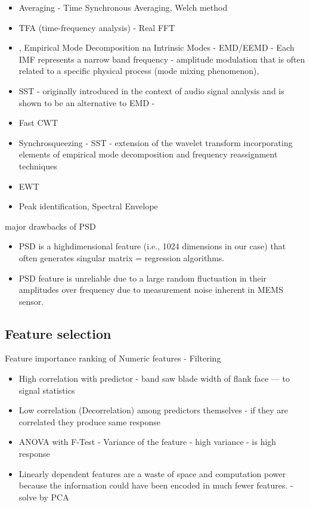 \begin{itemize}
\item Averaging - Time Synchronous Averaging, Welch method
\item TFA (time-frequency analysis) - Real FFT
\item, Empirical Mode Decomposition na Intrinsic Modes - EMD/EEMD - Each IMF represents a narrow band frequency - amplitude modulation that is often related to a specific physical process (mode mixing phenomenon),\cite{wang_computational_2014}

\item SST - originally introduced in the context of audio signal analysis and is shown to be an alternative to EMD -  \cite{herrera_applications_2014}

\item Fast CWT
\item Synchrosqueezing - SST - extension of the wavelet transform incorporating elements of empirical mode decomposition and frequency reassignment techniques
\item EWT 
\item Peak identification, Spectral Envelope
\end{itemize}


major drawbacks of PSD
\begin{itemize}
	\item PSD is a highdimensional feature (i.e., 1024 dimensions in our case) that often generates singular matrix = regression algorithms.
	\item PSD feature is unreliable due to a large random fluctuation in their amplitudes over frequency due to measurement noise inherent in MEMS sensor.
\end{itemize}










\subsection{Feature selection}
Feature importance ranking of Numeric features - Filtering
\begin{itemize}
\item High correlation with predictor - band saw blade width of flank face --- to signal statistics
\item Low correlation (Decorrelation) among predictors themselves - if they are correlated they produce same response
\item ANOVA with F-Test - Variance of the feature - high variance - is high response
\item Linearly dependent features are a waste of space and computation power because the information could have been encoded in much fewer features. \cite{zheng_feature_2018} - solve by PCA
\end{itemize}

